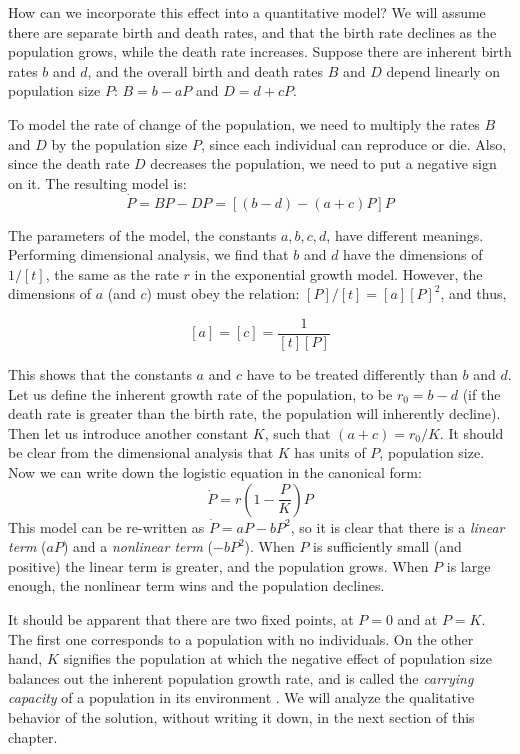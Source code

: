 \documentclass[
]{book}
\theoremstyle{definition}
\theoremstyle{definition}
\theoremstyle{definition}
\theoremstyle{remark}
\begin{document}
How can we incorporate this effect into a quantitative model? We will assume there are separate birth and death rates, and that the birth rate declines as the population grows, while the death rate increases. Suppose there are inherent birth rates \(b\) and \(d\), and the overall birth and death rates \(B\) and \(D\) depend linearly on population size \(P\): \(B = b - aP\) and \(D = d + cP\).

To model the rate of change of the population, we need to multiply the rates \(B\) and \(D\) by the population size \(P\), since each individual can reproduce or die. Also, since the death rate \(D\) decreases the population, we need to put a negative sign on it. The resulting model is:
\[ \dot P = BP - DP = [(b-d)-(a+c)P]P \]

The parameters of the model, the constants \(a,b,c,d\), have different meanings. Performing  dimensional analysis, we find that \(b\) and \(d\) have the dimensions of \(1/[t]\), the same as the rate \(r\) in the exponential growth model. However, the dimensions of \(a\) (and \(c\)) must obey the relation: \([P]/[t] = [a][P]^2\), and thus,

\[[a]=[c] = \frac{1}{[t][P]}\]

This shows that the constants \(a\) and \(c\) have to be treated differently than \(b\) and \(d\). Let us define the inherent growth rate of the population, to be \(r_0=b-d\) (if the death rate is greater than the birth rate, the population will inherently decline). Then let us introduce another constant \(K\), such that \((a+c)=r_0/K\). It should be clear from the dimensional analysis that \(K\) has units of \(P\), population size. Now we can write down the logistic equation in the canonical form:
\begin{equation}
\dot P = r\left(1-\frac{P}{K}\right)P
\label{eq:log_cont_model}
\end{equation}
This model can be re-written as \(\dot P = aP -bP^2\), so it is clear that there is a \emph{linear term} (\(aP\)) and a \emph{nonlinear term} (\(-bP^2\)). When \(P\) is sufficiently small (and positive) the linear term is greater, and the population grows. When \(P\) is large enough, the nonlinear term wins and the population declines. 

It should be apparent that there are two fixed points, at \(P=0\) and at \(P=K\). The first one corresponds to a population with no individuals. On the other hand, \(K\) signifies the population at which the negative effect of population size balances out the inherent population growth rate, and is called the  \emph{carrying capacity} of a population in its environment \citep{otto_biologists_2007}. We will analyze the qualitative behavior of the solution, without writing it down, in the next section of this chapter.
\end{document}
